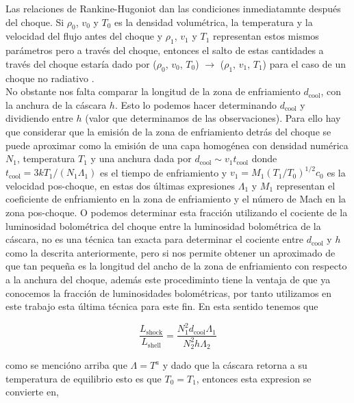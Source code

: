 Las relaciones de Rankine-Hugoniot dan las condiciones inmediatamnte después del choque. Si \(\rho_{0}\), \(v_{0}\) y \(T_{0}\) es la densidad volumétrica, la temperatura y la velocidad del flujo antes del choque y \(\rho_{1}\), \(v_{1}\) y \(T_{1}\) representan estos mismos parámetros pero a través del choque, entonces el salto de estas cantidades a través del choque estaría dado por (\(\rho_{0}\), \(v_{0}\), \(T_{0}\)) \(\rightarrow\) (\(\rho_{1}\), \(v_{1}\), \(T_{1}\)) para el caso de un choque no radiativo .\\ 

No obstante nos falta comparar la longitud de la zona de enfriamiento \(d_{\text{cool}}\), con la anchura de la cáscara \(h\). Esto lo podemos hacer determinando \(d_{\text{cool}}\) y dividiendo entre \(h\) (valor que determinamos de las observaciones). Para ello hay que considerar que la emisión de la zona de enfriamiento detrás del choque se puede aproximar como la emisión de una capa homogénea con densidad numérica \(N_{1}\), temperatura \(T_{1}\) y una anchura dada por \(d_{\text{cool}} \sim v_{1}t_{\text{cool}}\) donde \(t_{\text{cool}} = 3kT_{1}/(N_{1}\Lambda_{1})\) es el tiempo de enfriamiento y \(v_{1} = M_{1}(T_{1}/T_{0})^{1/2}c_{0}\) es la velocidad pos-choque, en estas dos últimas expresiones \(\Lambda_{1}\) y \(M_{1}\) representan el coeficiente de enfriamiento en la zona de enfriamiento y el número de Mach en la zona pos-choque. O podemos determinar esta fracción utilizando el cociente de la luminosidad bolométrica del choque entre la luminosidad bolométrica de la cáscara, no es una técnica tan exacta para determinar el cociente entre  \(d_{\text{cool}}\) y \(h\) como la descrita anteriormente, pero si nos permite obtener un aproximado de que tan pequeña es la longitud del ancho de la zona de enfriamiento con respecto a la anchura del choque, además este procediminto tiene la ventaja de que ya conocemos la fracción de luminosidades bolométricas, por tanto utilizamos en este trabajo esta última técnica para este fin. En esta sentido tenemos que 

\begin{equation}
  \label{eq:lumi-long}
  \frac{L_{\text{shock}}}{L_{\text{shell}}} = \frac{N^{2}_{1}d_{\text{cool}}\Lambda_{1}}{N^{2}_{2}h\Lambda_{2}}
\end{equation}

como se mencióno arriba que \(\Lambda = T^{a}\) y dado que la cáscara retorna a su temperatura de equilibrio esto es que \(T_{0} = T_{1}\), entonces esta expresion se convierte en,

